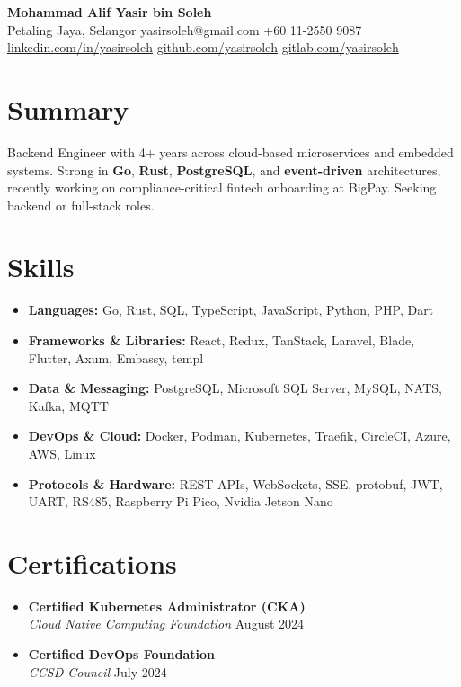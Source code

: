 \documentclass[11pt]{article}
\begin{document}
\begin{center}
{\Large\textbf{Mohammad Alif Yasir bin Soleh}}\\[2pt]
{\footnotesize Petaling Jaya, Selangor \textbullet{} yasirsoleh@gmail.com \textbullet{} +60 11-2550 9087  \linebreak
\href{https://linkedin.com/in/yasirsoleh}{linkedin.com/in/yasirsoleh} \textbullet{}
\href{https://github.com/yasirsoleh}{github.com/yasirsoleh} \textbullet{}
\href{https://gitlab.com/yasirsoleh}{gitlab.com/yasirsoleh}}
\end{center}

\section{Summary}
Backend Engineer with 4+ years across cloud-based microservices and embedded systems. Strong in \textbf{Go}, \textbf{Rust}, \textbf{PostgreSQL}, and \textbf{event-driven} architectures, recently working on compliance-critical fintech onboarding at BigPay. Seeking backend or full-stack roles.

\section{Skills}

\begin{itemize}
  \item \textbf{Languages:} Go, Rust, SQL, TypeScript, JavaScript, Python, PHP, Dart
  \item \textbf{Frameworks \& Libraries:} React, Redux, TanStack, Laravel, Blade, Flutter, Axum, Embassy, templ
  \item \textbf{Data \& Messaging:} PostgreSQL, Microsoft SQL Server, MySQL, NATS, Kafka, MQTT
  \item \textbf{DevOps \& Cloud:} Docker, Podman, Kubernetes, Traefik, CircleCI, Azure, AWS, Linux
  \item \textbf{Protocols \& Hardware:} REST APIs, WebSockets, SSE, protobuf, JWT, UART, RS485, Raspberry Pi Pico, Nvidia Jetson Nano
\end{itemize}

\section{Certifications}

\begin{itemize}
  \item \textbf{Certified Kubernetes Administrator (CKA)}\\
        \textit{Cloud Native Computing Foundation} \hfill August 2024
  \item \textbf{Certified DevOps Foundation}\\
        \textit{CCSD Council} \hfill July 2024
\end{itemize}
\end{document}
